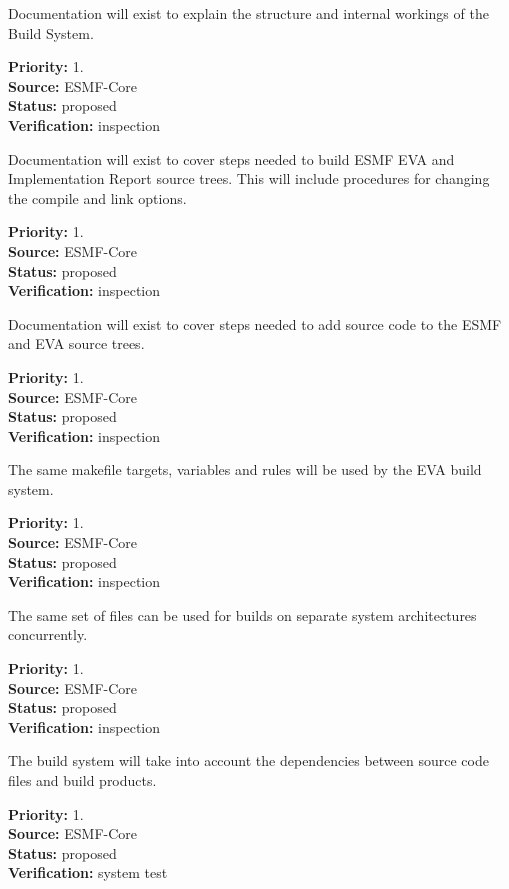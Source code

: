 Documentation will exist to explain the structure and 
internal workings of the Build System.
\begin{reqlist}
{\bf Priority:} 1. \\
{\bf Source:} ESMF-Core \\
{\bf Status:} proposed \\
{\bf Verification:} inspection
\end{reqlist}

Documentation will exist to cover steps needed to build ESMF
EVA and Implementation Report  source trees.  This will include procedures for 
changing the compile and link options.
\begin{reqlist}
{\bf Priority:} 1. \\
{\bf Source:} ESMF-Core \\
{\bf Status:} proposed \\
{\bf Verification:} inspection
\end{reqlist}

Documentation will exist to cover steps needed to add source
code to the ESMF and EVA source trees.
\begin{reqlist}
{\bf Priority:} 1. \\
{\bf Source:} ESMF-Core \\
{\bf Status:} proposed \\
{\bf Verification:} inspection
\end{reqlist}

The same makefile targets, variables and rules
will be used by the EVA build system.
\begin{reqlist}
{\bf Priority:} 1. \\
{\bf Source:} ESMF-Core \\
{\bf Status:} proposed \\
{\bf Verification:} inspection
\end{reqlist}


The same set of files can be used for builds on separate 
system architectures concurrently.
\begin{reqlist}
{\bf Priority:} 1. \\
{\bf Source:} ESMF-Core \\
{\bf Status:} proposed \\
{\bf Verification:} inspection
\end{reqlist}

The build system will take into account the dependencies 
between source code files and build products.  
\begin{reqlist}
{\bf Priority:} 1. \\
{\bf Source:} ESMF-Core \\
{\bf Status:} proposed \\
{\bf Verification:} system test
\end{reqlist}

